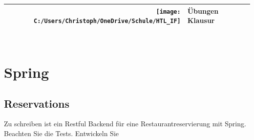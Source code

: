 
\usepackage{listings}


\noindent
	\begin{tabular}{r | l}
		\texttt{[image: C:/Users/Christoph/OneDrive/Schule/HTL\_IF]} &
		\Huge{Übungen Klausur}\\
		\hline
	\end{tabular}\\

\section{Spring}


\subsection{Reservations}
Zu schreiben ist ein Restful Backend für eine Restaurantreservierung mit Spring. Beachten Sie die Tests.
Entwickeln Sie
